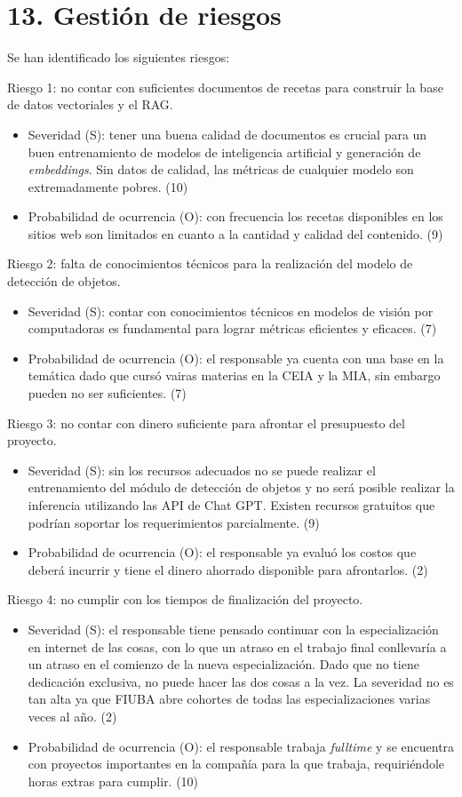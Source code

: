 \documentclass[
11pt, %
]{charter}
\begin{document}
\section{13. Gestión de riesgos}
\label{sec:riesgos}
Se han identificado los siguientes riesgos: 

Riesgo 1: no contar con suficientes documentos de recetas para construir la base de datos vectoriales y el RAG.
\begin{itemize}
\item Severidad (S): tener una buena calidad de documentos es crucial para un buen entrenamiento de modelos de inteligencia artificial y generación de \textit{embeddings}. Sin datos de calidad, las métricas de cualquier modelo son extremadamente pobres. (10)
\item Probabilidad de ocurrencia (O): con frecuencia los recetas disponibles en los sitios web son limitados en cuanto a la cantidad y calidad del contenido. (9)
\end{itemize}

Riesgo 2: falta de conocimientos técnicos para la realización del modelo de detección de objetos.
\begin{itemize}
\item Severidad (S): contar con conocimientos técnicos en modelos de visión por computadoras es fundamental para lograr métricas eficientes y eficaces. (7)
\item Probabilidad de ocurrencia (O):  el responsable ya cuenta con una base en la temática dado que cursó vairas materias en la CEIA y la MIA, sin embargo pueden no ser suficientes. (7)
\end{itemize}

Riesgo 3: no contar con dinero suficiente para afrontar el presupuesto del proyecto.
\begin{itemize}
\item Severidad (S): sin los recursos adecuados no se puede realizar el entrenamiento del módulo de detección de objetos y no será posible realizar la inferencia utilizando las API de Chat GPT. Existen recursos gratuitos que podrían soportar los requerimientos parcialmente. (9)
\item Probabilidad de ocurrencia (O): el responsable ya evaluó los costos que deberá incurrir y tiene el dinero ahorrado disponible para afrontarlos. (2)
\end{itemize}

Riesgo 4: no cumplir con los tiempos de finalización del proyecto.
\begin{itemize}
\item Severidad (S): el responsable tiene pensado continuar con la especialización en internet de las cosas, con lo que un atraso en el trabajo final conllevaría a un atraso en el comienzo de la nueva especialización. Dado que no tiene dedicación exclusiva, no puede hacer las dos cosas a la vez. La severidad no es tan alta ya que FIUBA abre cohortes de todas las especializaciones varias veces al año. (2)
\item Probabilidad de ocurrencia (O): el responsable trabaja \textit{fulltime} y se encuentra con proyectos importantes en la compañía para la que trabaja, requiriéndole horas extras para cumplir. (10)
\end{itemize}
\end{document}

